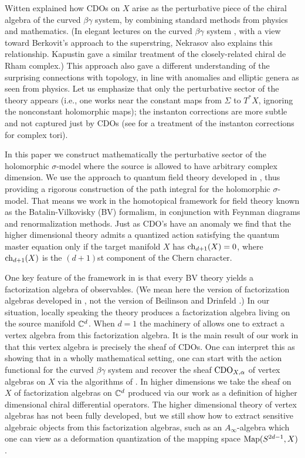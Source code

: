 Witten \cite{WittenCDO} explained how CDOs on $X$ arise as the perturbative piece of the chiral algebra of the curved $\beta\gamma$ system, by combining standard methods from physics and mathematics. (In elegant lectures on the curved $\beta\gamma$ system \cite{Nek}, with a view toward Berkovit's approach to the superstring, Nekrasov also explains this relationship.  Kapustin \cite{KapCDR} gave a similar treatment of the closely-related chiral de Rham complex.) This approach also gave a different understanding of the surprising connections with topology, in line with anomalies and elliptic genera as seen from physics. 
Let us emphasize that only the perturbative sector of the theory appears (i.e., one works near the constant maps from $\Sigma$ to $T^*X$, ignoring the nonconstant holomorphic maps); the instanton corrections are more subtle and not captured just by CDOs (see \cite{KapOrlov} for a treatment of the instanton corrections for complex tori).

In this paper we construct mathematically the perturbative sector of the holomorphic $\sigma$-model where the source is allowed to have arbitrary complex dimension.
We use the approach to quantum field theory developed in \cite{CostelloRenormalization, CG1,CG2}, thus providing a rigorous construction of the path integral for the holomorphic $\sigma$-model. That means we work in the homotopical framework for field theory known as the Batalin-Vilkovisky (BV) formalism, in conjunction with Feynman diagrams and renormalization methods. 
Just as CDO's have an anomaly we find that the higher dimensional theory admits a quantized action satisfying the quantum master equation only if the target manifold $X$ has ${\rm ch}_{d+1}(X) = 0$, where ${\rm ch}_{d+1}(X)$ is the $(d+1)$st component of the Chern character.

One key feature of the framework in \cite{CG2} is that every BV theory yields a factorization algebra of observables. (We mean here the version of factorization algebras developed in \cite{CG1}, not the version of Beilinson and Drinfeld \cite{BD}.)
In our situation, locally speaking the theory produces a factorization algebra living on the source manifold $\mathbb C^d$.
When $d=1$ the machinery of \cite{CG1} allows one to extract a vertex algebra from this factorization algebra.
It is the main result of our work in \cite{GGW} that this vertex algebra is precisely the sheaf of CDOs.
One can interpret this as showing that in a wholly mathematical setting, one can start with the action functional for the curved $\beta\gamma$ system
and recover the sheaf ${\rm CDO}_{X,\alpha}$ of vertex algebras on $X$ via the algorithms of \cite{CostelloRenormalization, CG1, CG2}.
In higher dimensions we take the sheaf on $X$ of factorization algebras on $\mathbb C^d$ produced via our work as a definition of higher dimensional chiral differential operators.
The higher dimensional theory of vertex algebras has not been fully developed, but we still show how to extract sensitive algebraic objects from this factorization algebras, such as an $A_\infty$-algebra which one can view as a deformation quantization of the mapping space ${\rm Map}(S^{2d-1}, X)$. 

